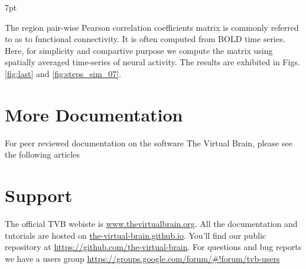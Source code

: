 \documentclass{tufte-handout}
\newenvironment{blah}{%
  \def\FrameCommand{%
    \hspace{1pt}%
    {\color{DarkOrange}\vrule width 2pt}%
    {\color{PeachPuff}\vrule width 4pt}%
    \colorbox{PeachPuff}%
  }%
  \MakeFramed{\advance\hsize-\width\FrameRestore}%
  \noindent\hspace{-4.55pt}%
  \begin{adjustwidth}{}{7pt}%
  \vspace{2pt}\vspace{2pt}%
}
{%
  \vspace{2pt}\end{adjustwidth}\endMakeFramed%
}
\begin{document}
\begin{blah}
The region pair-wise Pearson correlation coefficients matrix is commonly referred to as to functional connectivity. It is often computed from BOLD time series. Here, for simplicity and compartive purpose we compute the matrix using spatially averaged time-series of neural activity. The results are exhibited in Figs. \ref{fig:last} and \ref{fig:steps_sim_07}.
\end{blah}

\section{More Documentation}\label{sec:more-doc}
For peer reviewed documentation on the software The Virtual Brain, please see the following articles \citep{Sanz-Leon_2013,  Woodman_2014}





\section{Support}\label{sec:support}

The official TVB webiste is \url{www.thevirtualbrain.org}.  
All the documentation and tutorials are hosted on \url{the-virtual-brain.github.io}.
You'll find our public  repository at \url{https://github.com/the-virtual-brain}. 
For questions and bug reports we have a users group \url{https://groups.google.com/forum/#!forum/tvb-users}



\end{document}
